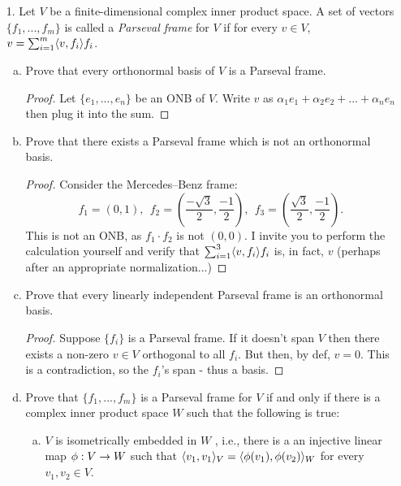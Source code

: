 
\begin{itemize}

\item[1.] Let $V$ be a finite-dimensional complex inner product space. A set of vectors
$\{f_1, ... , f_m\}$ is called a \textit{Parseval frame} for $V$ if for every $v \in V$, $v = \sum_{i=1}^{m} \langle{}v,f_i\rangle f_i$.
\begin{enumerate}[(a)]
    \item Prove that every orthonormal basis of $V$ is a Parseval frame.
    \begin{proof}
    Let $\{e_1, ... , e_n\}$ be an ONB of $V$. Write $v$ as $\alpha_1 e_1 + \alpha_2 e_2 + ... + \alpha_n e_n$ then plug it into the sum.
    \end{proof}
    
    \item Prove that there exists a Parseval frame which is not an orthonormal basis.
    \begin{proof}
    Consider the Mercedes–Benz frame: 
    $$f_1 = \left(0, 1 \right), \ \ f_2 = \left(\frac{-\sqrt{3}}{2}, \frac{-1}{2}\right), \ \ f_3 = \left(\frac{\sqrt{3}}{2}, \frac{-1}{2}\right).$$
    This is not an ONB, as $f_1 \cdot f_2$ is not $(0,0)$. I invite you to perform the calculation yourself and verify that $\sum_{i=1}^{3} \langle{}v,f_i\rangle f_i$ is, in fact, $v$ (perhaps after an appropriate normalization...)
    \end{proof}
    
    \item Prove that every linearly independent Parseval frame is an orthonormal basis.
    \begin{proof}
    Suppose $\{f_i\}$ is a Parseval frame. If it doesn't span $V$ then there exists a non-zero $v \in V$ orthogonal to all $f_i$. But then, by def, $v=0$. This is a contradiction, so the $f_i$'s span - thus a basis.
    \end{proof}
    
    \item Prove that $\{f_1, ... , f_m\}$ is a Parseval frame for $V$ if and only if there is a complex inner product space $W$ such that the following is true:
    \begin{enumerate}[(a)]
        \item $V$ is isometrically embedded in $W$ , i.e., there is a an injective linear map $\phi : V \rightarrow W$ such that $\langle{}v_1,v_1\rangle_V = \langle{}\phi(v_1),\phi(v_2)\rangle_W$ for every $v_1, v_2 \in V$.


\end{enumerate}
\end{enumerate}
\end{itemize}
